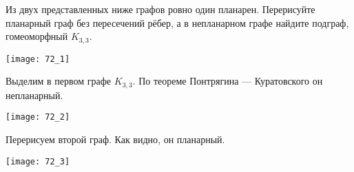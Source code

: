 \begin{task}{72}
Из двух представленных ниже графов ровно один планарен. Перерисуйте планарный граф без пересечений рёбер, а в непланарном графе найдите подграф, гомеоморфный $K_{3,3}$.

\begin{center}
  \texttt{[image: 72\_1]}
\end{center}
\end{task}

\begin{solution}
Выделим в первом графе $K_{3,3}$. По теореме Понтрягина — Куратовского он непланарный.
\begin{center}
  \texttt{[image: 72\_2]}
\end{center}
Перерисуем второй граф. Как видно, он планарный.
\begin{center}
  \texttt{[image: 72\_3]}
\end{center}
\end{solution}